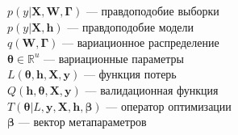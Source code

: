 $p(y|\mathbf{X}, \mathbf{W}, \boldsymbol{\Gamma})$ --- правдоподобие выборки\\
$p(y|\mathbf{X}, \mathbf{h})$ --- правдоподобие модели\\
$q(\mathbf{W}, \boldsymbol{\Gamma})$ --- вариационное распределение\\
$\boldsymbol{\theta} \in \mathbb{R}^u$ --- вариационные параметры\\
$L(\boldsymbol{\theta}, \mathbf{h}, \mathbf{X}, \mathbf{y})$ --- функция потерь\\
$Q(\mathbf{h}, \boldsymbol{\theta},  \mathbf{X}, \mathbf{y})$ --- валидационная функция\\
$T(\boldsymbol{\theta}| L, \mathbf{y}, \mathbf{X},  \mathbf{h}, \boldsymbol{\beta})$ --- оператор оптимизации\\
$\boldsymbol{\beta}$ --- вектор метапараметров\\
